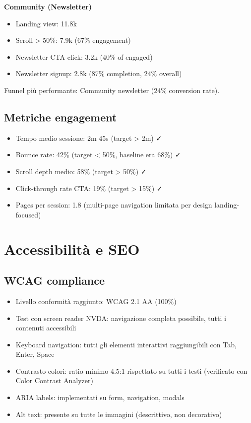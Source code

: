 \textbf{Community (Newsletter)}
\begin{itemize}
  \item Landing view: 11.8k
  \item Scroll > 50\%: 7.9k (67\% engagement)
  \item Newsletter CTA click: 3.2k (40\% of engaged)
  \item Newsletter signup: 2.8k (87\% completion, 24\% overall)
\end{itemize}

Funnel più performante: Community newsletter (24\% conversion rate).

\subsection{Metriche engagement}
\begin{itemize}
  \item Tempo medio sessione: 2m 45s (target > 2m) ✓
  \item Bounce rate: 42\% (target < 50\%, baseline era 68\%) ✓
  \item Scroll depth medio: 58\% (target > 50\%) ✓
  \item Click-through rate CTA: 19\% (target > 15\%) ✓
  \item Pages per session: 1.8 (multi-page navigation limitata per 
        design landing-focused)
\end{itemize}

\section{Accessibilità e SEO}
\subsection{WCAG compliance}
\begin{itemize}
  \item Livello conformità raggiunto: WCAG 2.1 AA (100\%)
  \item Test con screen reader NVDA: navigazione completa possibile, 
        tutti i contenuti accessibili
  \item Keyboard navigation: tutti gli elementi interattivi raggiungibili 
        con Tab, Enter, Space
  \item Contrasto colori: ratio minimo 4.5:1 rispettato su tutti i testi 
        (verificato con Color Contrast Analyzer)
  \item ARIA labels: implementati su form, navigation, modals
  \item Alt text: presente su tutte le immagini (descrittivo, non decorativo)
\end{itemize}

